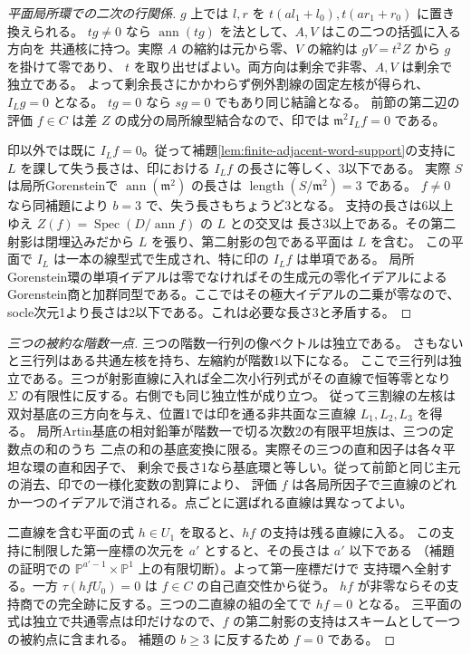 \begin{proof}[平面局所環での二次の行関係]
$g$ 上では $l,r$ を $t(a l_1+l_0),t(a r_1+r_0)$ に置き換えられる。
$tg\ne0$ なら $\operatorname{ann}(tg)$ を法として、$A,V$ はこの二つの括弧に入る方向を
共通核に持つ。実際 $A$ の縮約は元から零、$V$ の縮約は $gV=t^2 Z$ から $g$ を掛けて零であり、
$t$ を取り出せばよい。両方向は剰余で非零、$A,V$ は剰余で独立である。
よって剰余長さにかかわらず例外割線の固定左核が得られ、$I_L g=0$ となる。
$tg=0$ なら $sg=0$ でもあり同じ結論となる。
前節の第二辺の評価 $f\in C$ は差 $Z$ の成分の局所線型結合なので、印では
$\mathfrak m^2 I_L f=0$ である。

印以外では既に $I_L f=0$。従って補題\ref{lem:finite-adjacent-word-support}の支持に
$L$ を課して失う長さは、印における $I_L f$ の長さに等しく、3以下である。
実際 $S$ は局所Gorensteinで $\operatorname{ann}(\mathfrak m^2)$ の長さは
$\operatorname{length}(S/\mathfrak m^2)=3$ である。
$f\ne0$ なら同補題により $b=3$ で、失う長さもちょうど3となる。
支持の長さは6以上ゆえ $Z(f)=\operatorname{Spec}(D/\operatorname{ann} f)$ の $L$ との交叉は
長さ3以上である。その第二射影は閉埋込みだから $L$ を張り、第二射影の包である平面は $L$ を含む。
この平面で $I_L$ は一本の線型式で生成され、特に印の $I_L f$ は単項である。
局所Gorenstein環の単項イデアルは零でなければその生成元の零化イデアルによる
Gorenstein商と加群同型である。ここではその極大イデアルの二乗が零なので、
socle次元1より長さは2以下である。これは必要な長さ3と矛盾する。
\end{proof}

\begin{proof}[三つの被約な階数一点]
三つの階数一行列の像ベクトルは独立である。
さもないと三行列はある共通左核を持ち、左縮約が階数1以下になる。
ここで三行列は独立である。三つが射影直線に入れば全二次小行列式がその直線で恒等零となり
$\Sigma$ の有限性に反する。右側でも同じ独立性が成り立つ。
従って三割線の左核は双対基底の三方向を与え、位置1では印を通る非共面な三直線 $L_1,L_2,L_3$ を得る。
局所Artin基底の相対鉛筆が階数一で切る次数2の有限平坦族は、三つの定数点の和のうち
二点の和の基底変換に限る。実際その三つの直和因子は各々平坦な環の直和因子で、
剰余で長さ1なら基底環と等しい。従って前節と同じ主元の消去、印での一様化変数の割算により、
評価 $f$ は各局所因子で三直線のどれか一つのイデアルで消される。点ごとに選ばれる直線は異なってよい。

二直線を含む平面の式 $h\in U_1$ を取ると、$hf$ の支持は残る直線に入る。
この支持に制限した第一座標の次元を $a'$ とすると、その長さは $a'$ 以下である
（補題の証明での $\mathbb P^{a'-1}\times\mathbb P^1$ 上の有限切断）。よって第一座標だけで
支持環へ全射する。一方 $\tau(hf U_0)=0$ は $f\in C$ の自己直交性から従う。
$hf$ が非零ならその支持商での完全跡に反する。三つの二直線の組の全てで $hf=0$ となる。
三平面の式は独立で共通零点は印だけなので、$f$ の第二射影の支持はスキームとして一つの被約点に含まれる。
補題の $b\ge3$ に反するため $f=0$ である。
\end{proof}
